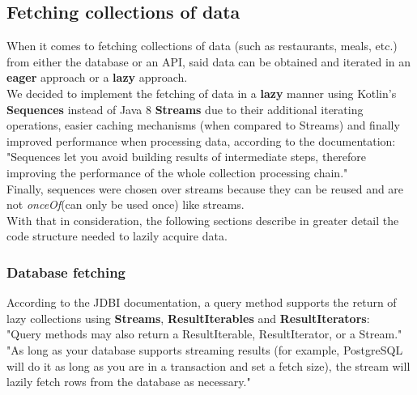 \subsection{Fetching collections of data}

When it comes to fetching collections of data (such as restaurants, meals, etc.) from either the database or an API, said data can be obtained
and iterated in an \textbf{eager} approach or a \textbf{lazy} approach.\\

We decided to implement the fetching of data in a \textbf{lazy} manner using Kotlin's \textbf{Sequences}\cite{sequences} instead of Java 8
\textbf{Streams}\cite{streams} due to their additional iterating operations, easier caching mechanisms (when compared to Streams)
and finally improved performance when processing data, according to the documentation:\\

"Sequences let you avoid building results of intermediate steps, therefore improving the performance of the whole collection processing chain."\\

Finally, sequences were chosen over streams because they can be reused and are not \textit{onceOf}(can only be used once) like streams.\\

With that in consideration, the following sections describe in greater detail the code structure needed to lazily acquire data.\\

\subsubsection{Database fetching}

According to the JDBI documentation\cite{jdbi}, a query method supports the return of lazy
collections using \textbf{Streams}, \textbf{ResultIterables} and \textbf{ResultIterators}:\\

"Query methods may also return a ResultIterable\cite{resultiterable}, ResultIterator\cite{resultiterator}, or a Stream\cite{streams}."\\

"As long as your database supports streaming results (for example, PostgreSQL will do it as long as you are in a transaction and set a fetch size), the
stream will lazily fetch rows from the database as necessary."\\

